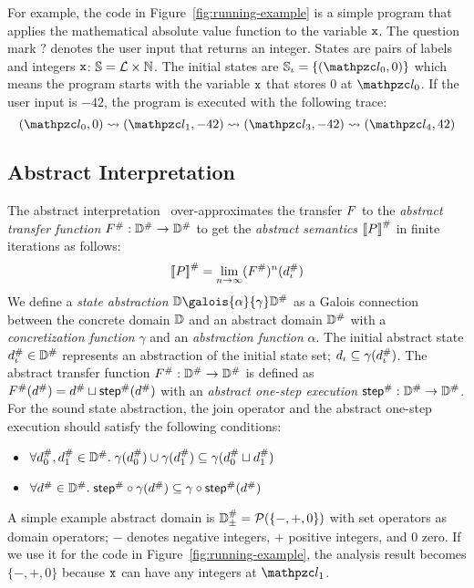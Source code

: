 For example, the code in Figure~\ref{fig:running-example} is a simple program
that applies the mathematical absolute value function to the variable $\texttt{x}$.
The question mark $?$ denotes the user input that returns an integer.  States
are pairs of labels and integers $\texttt{x}$: $\mathbb{S} = \mathcal{L} \times \mathbb{N}$.
The initial states are $\istset = \{ (\lab_0, 0) \}$ which means the program
starts with the variable $\texttt{x}$ that stores 0 at $\lab_0$.  If the user input is
$-42$, the program is executed with the following trace:
\[
  (\lab_0, 0) \trans (\lab_1, -42) \trans (\lab_3, -42) \trans (\lab_4, 42)
\]

\subsection{Abstract Interpretation}
The abstract interpretation~\cite{abs-interp-1977, abs-interp-1992}
over-approximates the transfer $F$ to the \textit{abstract transfer
function} ${F}^{\#}: {\mathbb{D}}^{\#} \rightarrow {\mathbb{D}}^{\#}$ to get the
\textit{abstract semantics} ${[\![{P}]\!]}^{\#}$ in finite iterations as follows:
\[
    {[\![{P}]\!]}^{\#} = \underset{n \rightarrow
    \infty}{\lim}{({F}^{\#})^n({d}^{\#}_\iota)}\\
\]
We define a \textit{state abstraction} $\dom \galois{\alpha}{\gamma} \absdom$ as
a Galois connection between the concrete domain $\mathbb{D}$ and an abstract domain
${\mathbb{D}}^{\#}$ with a \textit{concretization function} $\gamma$ and an
\textit{abstraction function} $\alpha$.  The initial abstract state ${d}^{\#}_\iota
\in {\mathbb{D}}^{\#}$ represents an abstraction of the initial state set; $d_\iota
\subseteq \gamma({d}^{\#}_\iota)$.  The abstract transfer function ${F}^{\#}:
{\mathbb{D}}^{\#} \rightarrow {\mathbb{D}}^{\#}$ is defined as ${F}^{\#}({d}^{\#}) = {d}^{\#}
\sqcup {\textsf{step}}^{\#}({d}^{\#})$ with an \textit{abstract one-step execution}
${\textsf{step}}^{\#}: {\mathbb{D}}^{\#} \rightarrow {\mathbb{D}}^{\#}$.  For the sound state abstraction, the
join operator and the abstract one-step execution should satisfy the following
conditions:
\begin{itemize}
  \item $\forall {d}^{\#}_0, {d}^{\#}_1 \in {\mathbb{D}}^{\#}. \; \gamma({d}^{\#}_0) \cup
    \gamma({d}^{\#}_1) \subseteq \gamma({d}^{\#}_0 \sqcup {d}^{\#}_1)$
  \item $\forall {d}^{\#} \in {\mathbb{D}}^{\#}. \; {\textsf{step}}^{\#} \circ \gamma({d}^{\#}) \subseteq
    \gamma \circ {\textsf{step}}^{\#}({d}^{\#})$
\end{itemize}

A simple example abstract domain is ${\mathbb{D}}^{\#}_\pm = \mathcal{P}(\{ -, +, 0 \})$ with
set operators as domain operators; $-$ denotes negative integers, $+$ positive
integers, and $0$ zero.  If we use it for the code in
Figure~\ref{fig:running-example}, the analysis result becomes $\{ -, +, 0 \}$
because $\texttt{x}$ can have any integers at $\lab_1$.


